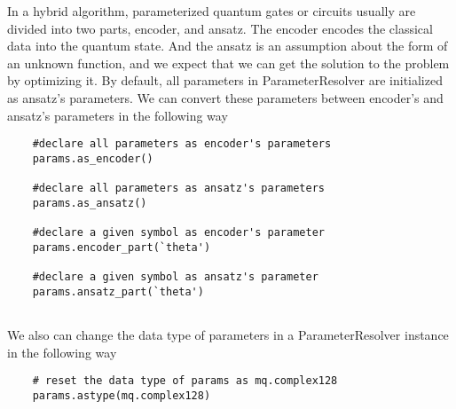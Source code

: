 In a hybrid algorithm, parameterized quantum gates or circuits usually are divided into two parts, encoder, and ansatz.
The encoder encodes the classical data into the quantum state. And the ansatz is an assumption about the form of an unknown function, and we expect that we can get the solution to the problem by optimizing it.
By default, all parameters in ParameterResolver are initialized as ansatz's parameters. 
We can convert these parameters between encoder's and ansatz's parameters in the following way
\begin{lstlisting}
    #declare all parameters as encoder's parameters
    params.as_encoder()

    #declare all parameters as ansatz's parameters
    params.as_ansatz()

    #declare a given symbol as encoder's parameter
    params.encoder_part(`theta')
    
    #declare a given symbol as ansatz's parameter
    params.ansatz_part(`theta')
    
\end{lstlisting}

We also can change the data type of parameters in a ParameterResolver instance in the following way
\begin{lstlisting}
    # reset the data type of params as mq.complex128
    params.astype(mq.complex128)
\end{lstlisting}